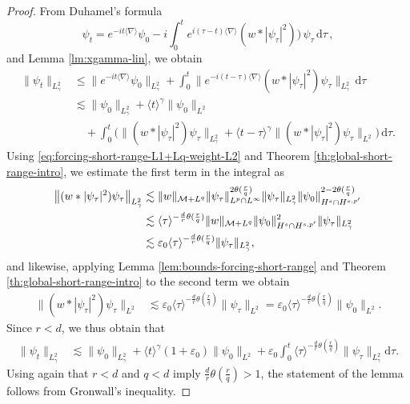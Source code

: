\documentclass[12pt]{article}
\theoremstyle{plain}
\newcommand{\meas}{\mathcal{M}}
\begin{document}
\begin{proof}
From Duhamel's formula
\begin{equation}\label{eq:Duhamel_secscatt}
\psi_{t}=e^{-it\langle\nabla\rangle}\psi_{0}-i\int_{0}^{t}e^{i(\tau-t)\langle\nabla\rangle}(w*|\psi_{\tau}|^{2}))\,\psi_{\tau}\,\mathrm{d}\tau\,,
\end{equation}
and Lemma \ref{lm:xgamma-lin}, we obtain
\begin{align*}
\|\psi_t\|_{L^2_\gamma}&\le \big\| e^{-it\langle\nabla\rangle}\psi_0\big\|_{L^2_\gamma}+ \int_0^t \big\| e^{-i(t-\tau)\langle\nabla\rangle} (w * |\psi_\tau|^2)\psi_\tau\big\|_{L^2_\gamma}\, \mathrm{d}\tau \\
&\lesssim\|\psi_0\|_{L^2_\gamma}+\langle t\rangle^\gamma\|\psi_0\|_{L^2}\\
&\quad+\int_0^t \Big(\big\| (w * |\psi_\tau|^2)\psi_\tau\big\|_{L^2_\gamma}+\langle t-\tau\rangle^\gamma\big\| (w * |\psi_\tau|^2)\psi_\tau\big\|_{L^2}\Big)\, \mathrm{d}\tau.
\end{align*}
Using \eqref{eq:forcing-short-range-L1+Lq-weight-L2} and Theorem \ref{th:global-short-range-intro}, we estimate the first term in the integral as \begin{align}
\big\|(w * |\psi_\tau|^2)\psi_\tau\big\|_{L^2_\gamma}&\lesssim \|w\|_{\meas +L^{q}} \|\psi_\tau\|_{L^{p}\cap L^\infty}^{2\theta(\frac{r}{q})} \|\psi_\tau\|_{L^{2}_\gamma} \|\psi_0\|_{H^s\cap H^{s,p'}}^{2-2\theta(\frac{r}{q})}\notag \\
&\lesssim \langle \tau\rangle^{-\frac dr\theta(\frac{r}{q})} \|w\|_{\meas +L^{q}}\|\psi_0\|_{H^s\cap H^{s,p'}}^2 \|\psi_\tau\|_{L^{2}_\gamma}\notag\\
&\lesssim \varepsilon_0\langle \tau\rangle^{-\frac dr \theta(\frac{r}{q}) }  \|\psi_\tau\|_{L^{2}_\gamma},\label{eq:boundL2-1}
\end{align}
and likewise, applying Lemma \ref{lem:bounds-forcing-short-range} and Theorem \ref{th:global-short-range-intro} to the second term we obtain
\begin{align}
\big\| (w * |\psi_\tau|^2)\psi_\tau\big\|_{L^2}
&\lesssim \varepsilon_0\langle \tau\rangle^{-\frac dr\theta(\frac{r}{q})}  \|\psi_\tau\|_{L^2} = \varepsilon_0\langle \tau\rangle^{-\frac dr\theta(\frac{r}{q})}  \|\psi_0\|_{L^2}. \label{eq:boundL2-2}
\end{align}
Since $r<d$, we thus obtain that
\begin{align*}
\|\psi_t\|_{L^2_\gamma}&\lesssim\|\psi_0\|_{L^2_\gamma}+\langle t\rangle^\gamma(1+\varepsilon_0)\|\psi_0\|_{L^2} +\varepsilon_0\int_0^t\langle \tau\rangle^{-\frac dr \theta(\frac{r}{q}) } \|\psi_\tau\|_{L^2_\gamma}\mathrm{d}\tau. 
\end{align*}
Using again that $r<d$ and $q<d$ imply $\frac dr \theta(\frac{r}{q}) >1$, the statement of the lemma follows from Gronwall's inequality.
\end{proof}
\end{document}
